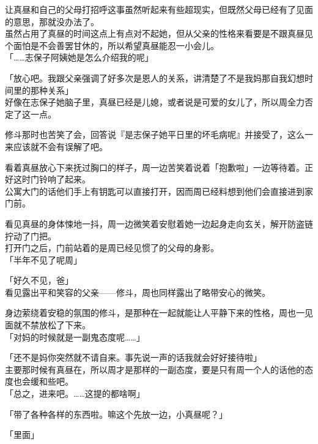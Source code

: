 让真昼和自己的父母打招呼这事虽然听起来有些超现实，但既然父母已经有了见面的意思，那就没办法了。\\

虽然占用了真昼的时间这点上有点对不起她，但从父亲的性格来看要是不跟真昼见个面怕是不会善罢甘休的，所以希望真昼能忍一小会儿。\\

「……志保子阿姨她是怎么介绍我的呢」

「放心吧。我跟父亲强调了好多次是恩人的关系，讲清楚了不是我妈那自我幻想时间里的那种关系」\\

好像在志保子她脑子里，真昼已经是儿媳，或者说是可爱的女儿了，所以周全力否定了这一点。

修斗那时也苦笑了会，回答说『是志保子她平日里的坏毛病呢』并接受了，这么一来应该就不会有误解了吧。

\vspace{2\baselineskip}

看着真昼放心下来抚过胸口的样子，周一边苦笑着说着「抱歉啦」一边等待着。正好这时门铃响了起来。\\

公寓大门的话他们手上有钥匙可以直接打开，因而周已经料想到他们会直接进到家门前。

看见真昼的身体悚地一抖，周一边微笑着安慰着她一边起身走向玄关，解开防盗链拧动了门把。\\

打开门之后，门前站着的是周已经见惯了的父母的身影。\\

「半年不见了呢周」

「好久不见，爸」\\

看见露出平和笑容的父亲——修斗，周也同样露出了略带安心的微笑。

身边萦绕着安稳的氛围的修斗，是那种在一起就能让人平静下来的性格，周也一见面就不禁放松了下来。\\

「对妈的时候就是一副鬼态度呢……」

「还不是妈你突然就不请自来。事先说一声的话我就会好好接待啦」\\

主要那时候有真昼在，所以周才是那样的一副态度，要是只有周一个人的话他的态度也会缓和些吧。\\

「总之，进来吧。……这提的都啥啊」

「带了各种各样的东西啦。嘛这个先放一边，小真昼呢？」

「里面」\\

